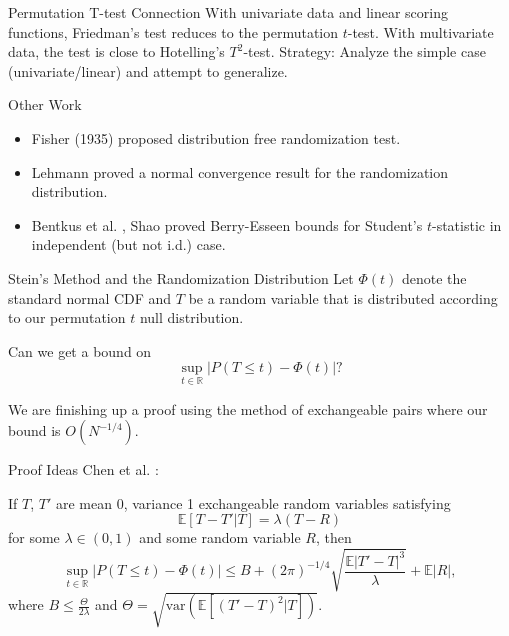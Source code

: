 \documentclass{beamer}
\newcommand{\var}{\mathrm{var}}
\newcommand{\E}{\mathbb{E}}
\begin{document}
\begin{frame}{Permutation T-test Connection}
  With univariate data and linear scoring functions, Friedman's test reduces
  to the permutation $t$-test.  \pause
  \newline
  \newline 
  With multivariate data, the test is close to Hotelling's
  $T^2$-test. \pause
  \newline
  \newline 
  Strategy: Analyze the simple case (univariate/linear) and attempt to
  generalize. 
\end{frame}

\begin{frame}{Other Work}
  \begin{itemize}
  \item Fisher (1935) \cite{fisher1935design} proposed distribution
    free randomization test.  \pause
  \item Lehmann \cite{lehmann1999elements} proved a normal convergence
    result for the randomization distribution. \pause
  \item Bentkus et al. \cite{bentkus1996berry}, Shao
    \cite{shao2005explicit} proved Berry-Esseen bounds for
    Student's $t$-statistic in independent (but not i.d.) case. 
  \end{itemize}
\end{frame}

\begin{frame}{Stein's Method and the Randomization Distribution}
  Let $\Phi(t)$ denote the standard normal CDF and $T$ be a random
  variable that is distributed according to our permutation $t$ null
  distribution. 

  Can we get a bound on
  \begin{equation*}
    \sup_{t \in \mathbb{R}} |P(T \leq t) - \Phi(t)|?
  \end{equation*}
  \pause

  We are finishing up a proof using the method of exchangeable pairs
  where our bound is $O(N^{-1/4})$.
\end{frame}

\begin{frame}{Proof Ideas}
  Chen et al. \cite{chen2010normal}:
  \begin{theorem}
    If $T$, $T'$ are mean 0, variance 1 exchangeable random variables
    satisfying
    \begin{equation*}
      \E[T-T'|T] = \lambda(T-R)    
    \end{equation*}
    for some $\lambda \in (0,1)$ and some random variable $R$, then 
    \begin{equation*}
      \sup_{t \in \mathbb{R}} |P(T \leq t) - \Phi(t)| \leq B +
      (2\pi)^{-1/4}\sqrt{\frac{\E|T'-T|^3}{\lambda}} + \E|R|,
    \end{equation*}
    where $B \leq \frac{\Theta}{2\lambda}$ and $\Theta =
    \sqrt{\var(\E[(T'-T)^2|T])}$. 
  \end{theorem}
\end{frame}
\end{document}
